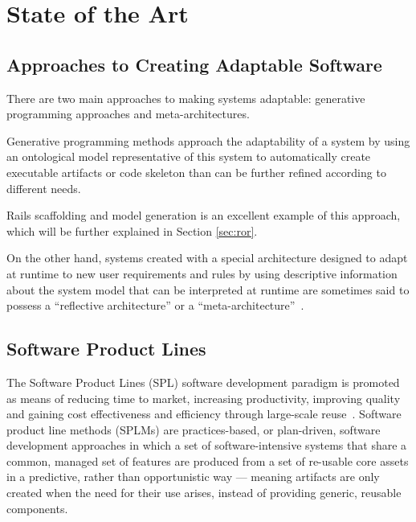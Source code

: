 \chapter{State of the Art}\label{chap:sota}


\section{Approaches to Creating Adaptable Software}\label{sec:approaches_to_creating_adaptable_software}

There are two main approaches to making systems adaptable: generative programming approaches and meta-architectures.

Generative programming methods approach the adaptability of a system by using an ontological model representative of this system to automatically create executable artifacts or code skeleton than can be further refined according to different needs.

Rails scaffolding and model generation is an excellent example of this approach, which will be further explained in Section \ref{sec:ror}.

On the other hand, systems created with a special architecture designed to adapt at runtime to new user requirements and rules by using descriptive information about the system model that can be interpreted at runtime are sometimes said to possess a ``reflective architecture'' or a ``meta-architecture''~\cite{YBJ01}.

\section{Software Product Lines}\label{sec:spl}

The Software Product Lines (SPL) software development paradigm is promoted as means of reducing time to market, increasing productivity, improving quality and gaining cost effectiveness and efficiency through large-scale reuse~\cite{TC06}. Software product line methods (SPLMs) are practices-based, or plan-driven, software development approaches in which a set of software-intensive systems that share a common, managed set of features are produced from a set of re-usable core assets in a predictive, rather than opportunistic way --- meaning artifacts are only created when the need for their use arises, instead of providing generic, reusable components.

